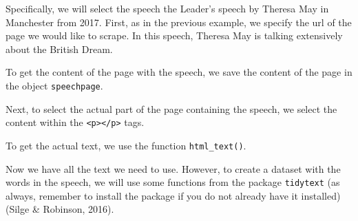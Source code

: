 \documentclass[12pt,oneside]{reedthesis}
\theoremstyle{definition}
\theoremstyle{definition}
\theoremstyle{definition}
\theoremstyle{remark}
\begin{document}
  Specifically, we will select the speech the Leader's speech by Theresa
  May in Manchester from 2017. First, as in the previous example, we
  specify the url of the page we would like to scrape. In this speech,
  Theresa May is talking extensively about the British Dream.
  \begin{Shaded}
  \begin{Highlighting}[]
  \StringTok{ }\NormalTok{(}
  \NormalTok{  )}
  \end{Highlighting}
  \end{Shaded}
  To get the content of the page with the speech, we save the content of
  the page in the object \texttt{speechpage}.
  \begin{Shaded}
  \begin{Highlighting}[]
  \StringTok{ }
  \end{Highlighting}
  \end{Shaded}
  Next, to select the actual part of the page containing the speech, we
  select the content within the
  \texttt{\textless{}p\textgreater{}\textless{}/p\textgreater{}} tags.
  \begin{Shaded}
  \begin{Highlighting}[]
  \StringTok{ }\NormalTok{)}
  \end{Highlighting}
  \end{Shaded}
  To get the actual text, we use the function \texttt{html\_text()}.
  \begin{Shaded}
  \begin{Highlighting}[]
  \StringTok{ }
  \end{Highlighting}
  \end{Shaded}
  Now we have all the text we need to use. However, to create a dataset
  with the words in the speech, we will use some functions from the
  package \texttt{tidytext} (as always, remember to install the package if
  you do not already have it installed) (Silge \& Robinson, 2016).
  \begin{Shaded}
  \begin{Highlighting}[]
  \NormalTok{(}\NormalTok{)}
  \end{Highlighting}
  \end{Shaded}
\end{document}
